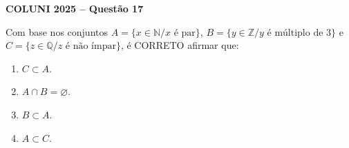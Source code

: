 \textbf{COLUNI 2025 -- Questão 17}\par\medskip Com base nos conjuntos $A=\{x\in\mathbb{N}/x\text{ é par}\}$, $B=\{y\in\mathbb{Z}/y\text{ é múltiplo de 3}\}$ e $C=\{z\in\mathbb{Q}/z\text{ é não ímpar}\}$, é CORRETO afirmar que:
\begin{enumerate}
\item $C\subset A$.
\item $A\cap B=\varnothing$.
\item $B\subset A$.
\item $A\subset C$.
\end{enumerate}
